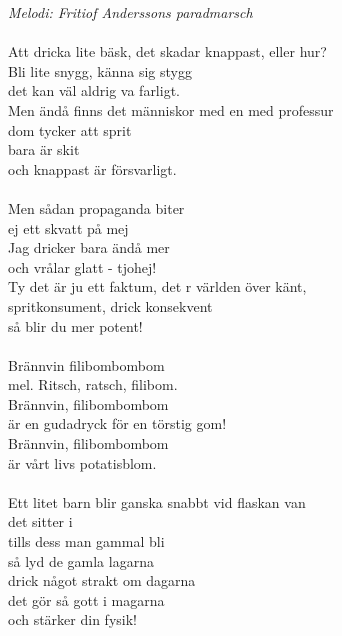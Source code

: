 {\footnotesize\textit{Melodi: Fritiof Anderssons paradmarsch}}\\
\\
Att dricka lite bäsk, det skadar knappast, eller hur?\\
Bli lite snygg, känna sig stygg\\
det kan väl aldrig va farligt.\\
Men ändå finns det människor med en med professur\\
dom tycker att sprit\\
bara är skit\\
och knappast är försvarligt.\\
\\
Men sådan propaganda biter\\
ej ett skvatt på mej\\
Jag dricker bara ändå mer\\
och vrålar glatt - tjohej!\\
Ty det är ju ett faktum, det r världen över känt,\\
spritkonsument, drick konsekvent\\
så blir du mer potent!\\
\\
Brännvin filibombombom\\
mel. Ritsch, ratsch, filibom.\\
Brännvin, filibombombom\\
är en gudadryck för en törstig gom!\\
Brännvin, filibombombom\\
är vårt livs potatisblom.\\
\\
Ett litet barn blir ganska snabbt vid flaskan van\\
det sitter i\\
tills dess man gammal bli\\
så lyd de gamla lagarna\\
drick något strakt om dagarna\\
det gör så gott i magarna\\
och stärker din fysik!
